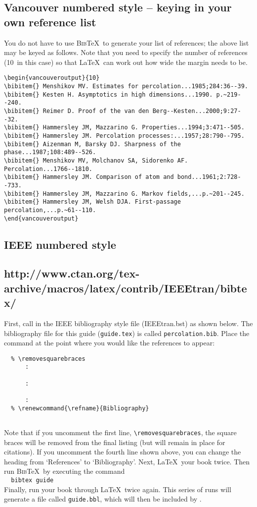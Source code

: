 \subsection*{Vancouver numbered style -- keying in your own reference list}
You do not have to use \textsc{Bib}\TeX\ to generate your list of references; the above list may be keyed as follows. Note that you need to specify the number of references (10~in this case) so that \LaTeX\ can work out how wide the margin needs to be.
\begin{verbatim}
\begin{vancouveroutput}{10}
\bibitem{} Menshikov MV. Estimates for percolation...1985;284:36--39.
\bibitem{} Kesten H. Asymptotics in high dimensions...1990. p.~219--240.
\bibitem{} Reimer D. Proof of the van den Berg--Kesten...2000;9:27--32.
\bibitem{} Hammersley JM, Mazzarino G. Properties...1994;3:471--505.
\bibitem{} Hammersley JM. Percolation processes:...1957;28:790--795.
\bibitem{} Aizenman M, Barsky DJ. Sharpness of the phase...1987;108:489--526.
\bibitem{} Menshikov MV, Molchanov SA, Sidorenko AF. Percolation...1766--1810.
\bibitem{} Hammersley JM. Comparison of atom and bond...1961;2:728--733.
\bibitem{} Hammersley JM, Mazzarino G. Markov fields,...p.~201--245.
\bibitem{} Hammersley JM, Welsh DJA. First-passage percolation,...p.~61--110.
\end{vancouveroutput}
\end{verbatim}

\subsection{IEEE numbered style}

\subsection*{http://www.ctan.org/tex-archive/macros/latex/contrib/IEEEtran/bibtex/}

First, call in the IEEE bibliography style file (IEEEtran.bst) as shown below. The bibliography file for this guide (\texttt{\cambridge guide.tex}) is called \texttt{percolation.bib}. Place the \verb"" command at the point where you would like the references to appear:
%
\begin{verbatim}
  % \removesquarebraces
      :
    
      :
    
      :
  % \renewcommand{\refname}{Bibliography}
    
\end{verbatim}
%
Note that if you uncomment the first line, \verb"\removesquarebraces", the square braces will be removed from the final listing (but will remain in place for citations). If you uncomment the fourth line shown above, you can change the heading from `References' to `Bibliography'. Next, \LaTeX\ your book twice. Then run \textsc{Bib}\TeX\ by executing the command\\[0.5\baselineskip]
\verb"  bibtex "\texttt{\cambridge guide}\\[0.5\baselineskip]
Finally, run your book through \LaTeX\ twice again. This series of runs will generate a file called \texttt{\cambridge guide.bbl}, which will then be included by \verb"".

